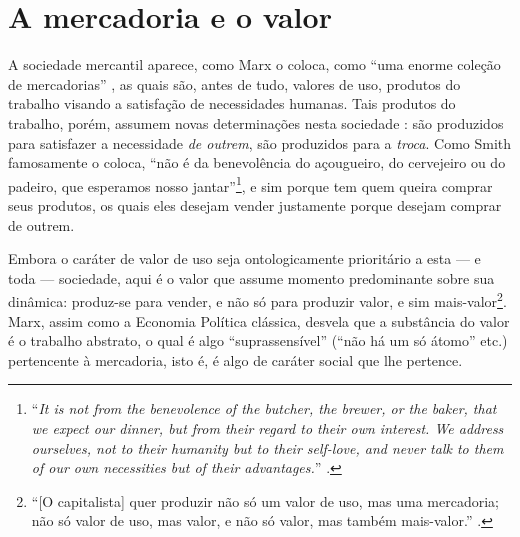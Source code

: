 \section{A mercadoria e o valor}
A sociedade mercantil aparece, como Marx o coloca, como ``uma enorme coleção de mercadorias'' \parencite[p. 113]{Marx2017}, as quais são, antes de tudo, valores de uso, produtos do trabalho visando a satisfação de necessidades humanas. Tais produtos do trabalho, porém, assumem novas determinações nesta sociedade : são produzidos para satisfazer a necessidade \textit{de outrem}, são produzidos para a \textit{troca}. Como Smith famosamente o coloca, ``não é da benevolência do açougueiro, do cervejeiro ou do padeiro, que esperamos nosso jantar''\footnote{``\textit{It is not from the benevolence of the butcher, the brewer, or the baker, that we expect our dinner, but from their regard to their own interest. We address ourselves, not to their humanity but to their self-love, and never talk to them of our own necessities but of their advantages.}'' \parencite[p. 43]{Smith1904}.}, e sim porque tem quem queira comprar seus produtos, os quais eles desejam vender justamente porque desejam comprar de outrem. 

Embora o caráter de valor de uso seja ontologicamente prioritário a esta — e toda — sociedade, aqui é o valor que assume momento predominante sobre sua dinâmica: produz-se para vender, e não só para produzir valor, e sim mais-valor\footnote{``[O capitalista] quer produzir não só um valor de uso, mas uma mercadoria; não só valor de uso, mas valor, e não só valor, mas também mais-valor.'' \parencite[p. 263]{Marx2017}.}. Marx, assim como a Economia Política clássica, desvela que a substância do valor é o trabalho abstrato, o qual é algo ``suprassensível'' (``não há um só átomo'' etc.) pertencente à mercadoria, isto é, é algo de caráter social que lhe pertence.

